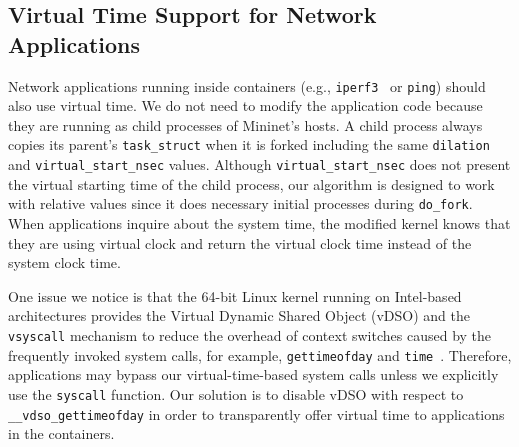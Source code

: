 \subsection{Virtual Time Support for Network Applications}
\label{VT:SubSec:ModificationApplications}
Network applications running inside containers (e.g., \texttt{iperf3}~\cite{iperf3} or \texttt{ping}) should also use virtual time. 
We do not need to modify the application code because they are running as child processes of Mininet's hosts. 
A child process always copies its parent's \texttt{task\_struct} when it is forked including the same \texttt{dilation} and \texttt{virtual\_start\_nsec} values. 
Although \texttt{virtual\_start\_nsec} does not present the virtual starting time of the child process,
our algorithm is designed to work with relative values since it does necessary initial processes during \texttt{do\_fork}. 
When applications inquire about the system time,
the modified kernel knows that they are using virtual clock and return the virtual clock time instead of the system clock time.

One issue we notice is that the 64-bit Linux kernel running on Intel-based architectures provides the Virtual Dynamic Shared Object (vDSO)
and the \texttt{vsyscall} mechanism to reduce the overhead of context switches caused by the frequently invoked system calls,
for example, \texttt{gettimeofday} and \texttt{time}~\cite{VDSO}. 
Therefore, applications may bypass our virtual-time-based system calls unless we explicitly use the \texttt{syscall} function.
Our solution is to disable vDSO with respect to \texttt{\_\_vdso\_gettimeofday} in order to transparently offer virtual time to applications in the containers.
